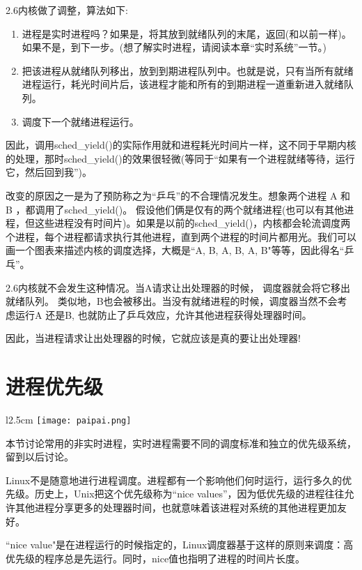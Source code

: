 2.6内核做了调整，算法如下:

\begin{enumerate}
\item 进程是实时进程吗？如果是，将其放到就绪队列的末尾，返回(和以前一样)。如果不是，到下一步。(想了解实时进程，请阅读本章“实时系统”一节。)
\item 把该进程从就绪队列移出，放到到期进程队列中。也就是说，只有当所有就绪进程运行，耗光时间片后，该进程才能和所有的到期进程一道重新进入就绪队列。
\item 调度下一个就绪进程运行。
\end{enumerate}

因此，调用sched\_yield()的实际作用就和进程耗光时间片一样，这不同于早期内核的处理，那时sched\_yield()的效果很轻微(等同于“如果有一个进程就绪等待，运行它，然后回到我”)。

改变的原因之一是为了预防称之为“乒乓”的不合理情况发生。想象两个进程 A 和 B ，都调用了sched\_yield()。 假设他们俩是仅有的两个就绪进程(也可以有其他进程，但这些进程没有时间片)。如果是以前的sched\_yield()，内核都会轮流调度两个进程，每个进程都请求执行其他进程，直到两个进程的时间片都用光。我们可以画一个图表来描述内核的调度选择，大概是``A, B, A, B, A, B"等等，因此得名“乒乓”。

2.6内核就不会发生这种情况。当A请求让出处理器的时候， 调度器就会将它移出就绪队列。 类似地，B也会被移出。当没有就绪进程的时候，调度器当然不会考虑运行A 还是B, 也就防止了乒乓效应，允许其他进程获得处理器时间。

因此，当进程请求让出处理器的时候，它就应该是真的要让出处理器!

\section{进程优先级}

\begin{wrapfigure}{l}{2.5cm}
  \texttt{[image: paipai.png]}
\end{wrapfigure}
\mbox{}\begin{flushleft}本节讨论常用的非实时进程，实时进程需要不同的调度标准和独立的优先级系统，留到以后讨论。\end{flushleft}

Linux不是随意地进行进程调度。进程都有一个影响他们何时运行，运行多久的优先级。历史上，Unix把这个优先级称为“nice values”，因为低优先级的进程往往允许其他进程分享更多的处理器时间，也就意味着该进程对系统的其他进程更加友好。

``nice value"是在进程运行的时候指定的，Linux调度器基于这样的原则来调度：高优先级的程序总是先运行。同时，nice值也指明了进程的时间片长度。

